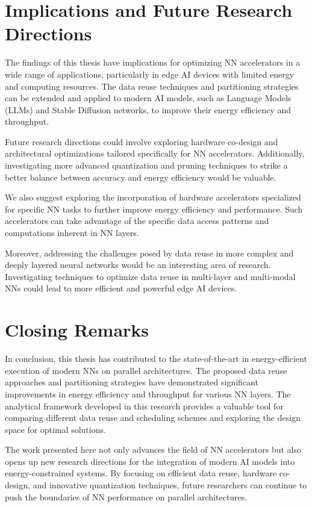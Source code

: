 \section{Implications and Future Research Directions}
The findings of this thesis have implications for optimizing NN accelerators in a wide range of applications, particularly in edge AI devices with limited energy and computing resources. The data reuse techniques and partitioning strategies can be extended and applied to modern AI models, such as Language Models (LLMs) and Stable Diffusion networks, to improve their energy efficiency and throughput.

Future research directions could involve exploring hardware co-design and architectural optimizations tailored specifically for NN accelerators. Additionally, investigating more advanced quantization and pruning techniques to strike a better balance between accuracy and energy efficiency would be valuable.

We also suggest exploring the incorporation of hardware accelerators specialized for specific NN tasks to further improve energy efficiency and performance. Such accelerators can take advantage of the specific data access patterns and computations inherent in NN layers.

Moreover, addressing the challenges posed by data reuse in more complex and deeply layered neural networks would be an interesting area of research. Investigating techniques to optimize data reuse in multi-layer and multi-modal NNs could lead to more efficient and powerful edge AI devices.

\section{Closing Remarks}
In conclusion, this thesis has contributed to the state-of-the-art in energy-efficient execution of modern NNs on parallel architectures. The proposed data reuse approaches and partitioning strategies have demonstrated significant improvements in energy efficiency and throughput for various NN layers. The analytical framework developed in this research provides a valuable tool for comparing different data reuse and scheduling schemes and exploring the design space for optimal solutions.

The work presented here not only advances the field of NN accelerators but also opens up new research directions for the integration of modern AI models into energy-constrained systems. By focusing on efficient data reuse, hardware co-design, and innovative quantization techniques, future researchers can continue to push the boundaries of NN performance on parallel architectures.

